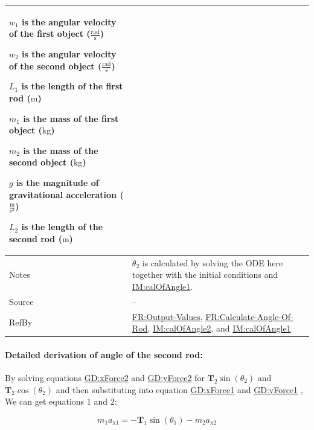 \documentclass[12pt]{article}
\begin{document}
\begin{minipage}{\textwidth}
\begin{tabular}{>{\raggedright}p{}>{\raggedright\arraybackslash}p{}}
\begin{symbDescription}
              \item{${w_{1}}$ is the angular velocity of the first object ($\frac{\text{rad}}{\text{s}}$)}
              \item{${w_{2}}$ is the angular velocity of the second object ($\frac{\text{rad}}{\text{s}}$)}
              \item{${L_{1}}$ is the length of the first rod (${\text{m}}$)}
              \item{${m_{1}}$ is the mass of the first object (${\text{kg}}$)}
              \item{${m_{2}}$ is the mass of the second object (${\text{kg}}$)}
              \item{$g$ is the magnitude of gravitational acceleration ($\frac{\text{m}}{\text{s}^{2}}$)}
              \item{${L_{2}}$ is the length of the second rod (${\text{m}}$)}
              \end{symbDescription}
\\ \midrule
Notes & ${θ_{2}}$ is calculated by solving the ODE here together with the initial conditions and \hyperref[IM:calOfAngle1]{IM:calOfAngle1}.
        
\\ \midrule
Source & --
         
\\ \midrule
RefBy & \hyperref[outputValues]{FR:Output-Values}, \hyperref[calcAng]{FR:Calculate-Angle-Of-Rod}, \hyperref[IM:calOfAngle2]{IM:calOfAngle2}, and \hyperref[IM:calOfAngle1]{IM:calOfAngle1}
        
\\ \bottomrule
\end{tabular}
\end{minipage}
\paragraph{Detailed derivation of angle of the second rod:}
\label{IM:calOfAngle2Deriv}
By solving equations \hyperref[GD:xForce2]{GD:xForce2} and \hyperref[GD:yForce2]{GD:yForce2} for ${\symbf{T}_{2}} \sin\left({θ_{2}}\right)$ and ${\symbf{T}_{2}} \cos\left({θ_{2}}\right)$ and then substituting into equation \hyperref[GD:xForce1]{GD:xForce1} and \hyperref[GD:yForce1]{GD:yForce1} , We can get equations 1 and 2:

\begin{displaymath}
{m_{1}} {a_{\text{x}1}}=-{\symbf{T}_{1}} \sin\left({θ_{1}}\right)-{m_{2}} {a_{\text{x}2}}
\end{displaymath}
\end{document}
